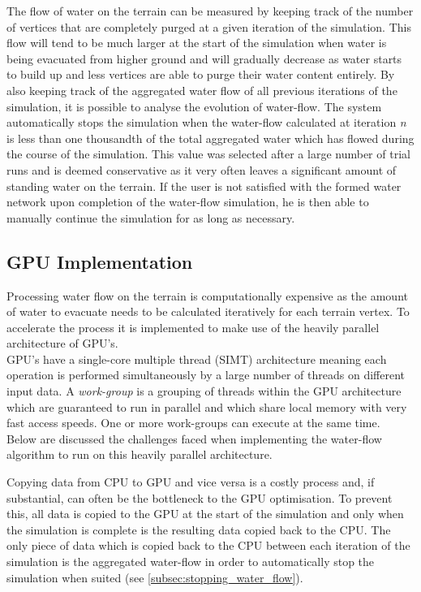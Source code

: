 The flow of water on the terrain can be measured by keeping track of the number of vertices that are completely purged at a given iteration of the simulation. This flow will tend to be much larger at the start of the simulation when water is being evacuated from higher ground and will gradually decrease as water starts to build up and less vertices are able to purge their water content entirely. By also keeping track of the aggregated water flow of all previous iterations of the simulation, it is possible to analyse the evolution of water-flow. The system automatically stops the simulation when the water-flow calculated at iteration \textit{n} is less than one thousandth of the total aggregated water which has flowed during the course of the simulation. This value was selected after a large number of trial runs and is deemed conservative as it very often leaves a significant amount of standing water on the terrain. If the user is not satisfied with the formed water network upon completion of the water-flow simulation, he is then able to manually continue the simulation for as long as necessary.

\subsection{GPU Implementation}

Processing water flow on the terrain is computationally expensive as the amount of water to evacuate needs to be calculated iteratively for each terrain vertex. To accelerate the process it is implemented to make use of the heavily parallel architecture of GPU's. \\

GPU's have a single-core multiple thread (SIMT) architecture meaning each operation is performed simultaneously by a large number of threads on different input data. A \textit{work-group} is a grouping of threads within the GPU architecture which are guaranteed to run in parallel and which share local memory with very fast access speeds. One or more work-groups can execute at the same time.\\

Below are discussed the challenges faced when implementing the water-flow algorithm to run on this heavily parallel architecture.

Copying data from CPU to GPU and vice versa is a costly process and, if substantial, can often be the bottleneck to the GPU optimisation. To prevent this, all data is copied to the GPU at the start of the simulation and only when the simulation is complete is the resulting data copied back to the CPU. The only piece of data which is copied back to the CPU between each iteration of the simulation is the aggregated water-flow in order to automatically stop the simulation when suited (see \ref{subsec:stopping_water_flow}).\\

